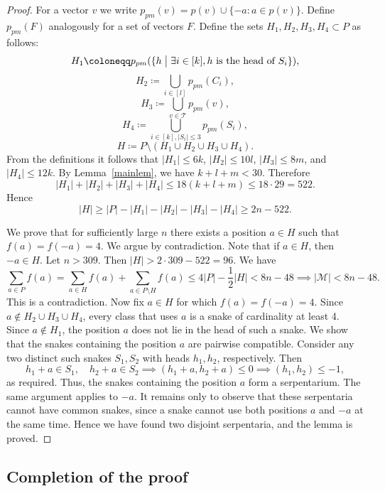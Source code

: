\documentclass[12pt,a4paper]{article}
\newcommand{\M}{\mathcal{M}}
\newcommand{\T}{\mathcal{T}}
\begin{document}
\begin{proof}
    For a vector $v$ we write $p_{pm}(v)=p(v)\cup\{-a:a\in p(v)\}$. Define $p_{pm}(F)$ analogously for a set of vectors $F$.
    Define the sets $H_1,H_2,H_3,H_4 \subset P$ as follows:
    \[
    H_1 \coloneqq p_{pm}(\{h \bigm| \exists i \in [k], h   \text{ is the head of } S_i\}),
    \]
    \[
    H_2 \coloneqq \bigcup_{i\in [l]} p_{pm}(C_i),
    \]
    \[
    H_3 \coloneqq \bigcup_{v \in \T} p_{pm}(v),
    \]
    \[
    H_4 \coloneqq \bigcup_{i \in [k], |S_i| \leqslant 3} p_{pm}(S_i),
    \]
    \[
    H \coloneqq P \setminus (H_1 \cup H_2 \cup H_3 \cup H_4).
    \]
    From the definitions it follows that $|H_1| \leqslant 6k$, $|H_2| \leqslant 10l$, $|H_3| \leqslant 8m$, and $|H_4| \leqslant 12k$. By Lemma~\ref{mainlem}, we have $k+l+m<30$. Therefore
    $$|H_1|+|H_2|+|H_3|+|H_4| \leqslant 18(k+l+m) \leqslant 18\cdot29=522.$$
    Hence
    $$|H| \geqslant |P|-|H_1|-|H_2|-|H_3|-|H_4| \geqslant 2n-522.$$

    We prove that for sufficiently large $n$ there exists a position $a \in H$ such that $f(a)=f(-a)=4$. We argue by contradiction. Note that if $a \in H$, then $-a \in H$. Let $n>309$. Then $|H|>2\cdot309-522=96$. We have
    \[
    \sum_{a\in P} f(a) = \sum_{a\in H} f(a) + \sum_{a\in P \setminus H} f(a)
    \leqslant
    4|P| - \frac{1}{2}|H| < 8n-48 \implies |\M|<8n-48.
    \]
    This is a contradiction. Now fix $a\in H$ for which $f(a)=f(-a)=4$. Since $a\notin H_2\cup H_3\cup H_4$, every class that uses $a$ is a snake of cardinality at least 4. Since $a\notin H_1$, the position $a$ does not lie in the head of such a snake. We show that the snakes containing the position $a$ are pairwise compatible. Consider any two distinct such snakes $S_1,S_2$ with heads $h_1,h_2$, respectively. Then
    $$h_1+a\in S_1, \quad h_2+a\in S_2 \implies (h_1+a,h_2+a)\leqslant 0 \implies (h_1,h_2)\leqslant -1,$$
    as required. Thus, the snakes containing the position $a$ form a serpentarium. The same argument applies to $-a$. It remains only to observe that these serpentaria cannot have common snakes, since a snake cannot use both positions $a$ and $-a$ at the same time. Hence we have found two disjoint serpentaria, and the lemma is proved.
\end{proof}

\subsection{Completion of the proof}
\end{document}
